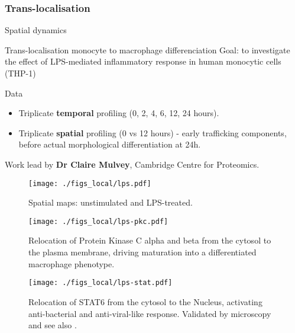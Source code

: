 \subsubsection{Trans-localisation}

\begin{frame}{Spatial dynamics}
  \begin{block}{Trans-localisation monocyte to macrophage
      differenciation}
    Goal: to investigate the effect of LPS-mediated inflammatory
    response in human monocytic cells (THP-1)    
  \end{block}

  \begin{block}{Data}
    \begin{itemize}
    \item Triplicate \textbf{temporal} profiling (0, 2, 4, 6, 12, 24
      hours).
    \item Triplicate \textbf{spatial} profiling (0 vs 12 hours) -
      early trafficking components, before actual morphological
      differentiation at 24h.
    \end{itemize}
  \end{block}

  Work lead by \textbf{Dr Claire Mulvey}, Cambridge Centre for
  Proteomics.
  
\end{frame}



\begin{frame}
  \begin{figure}[h]
    \centering
    \texttt{[image: ./figs\_local/lps.pdf]}
    \caption{Spatial maps: unstimulated and LPS-treated.}
  \end{figure}
\end{frame}

\begin{frame}
  \begin{figure}[h]
    \centering
    \texttt{[image: ./figs\_local/lps-pkc.pdf]}
    \caption{Relocation of Protein Kinase C alpha and beta from the
      cytosol to the plasma membrane, driving maturation into a
      differentiated macrophage phenotype.}
  \end{figure}
\end{frame}

\begin{frame}
  \begin{figure}[h]
    \centering
    \texttt{[image: ./figs\_local/lps-stat.pdf]}
    \caption{Relocation of STAT6 from the cytosol to the Nucleus,
      activating anti-bacterial and anti-viral-like
      response. Validated by microscopy and see also
      \cite{Chen:2011}.}
  \end{figure}
\end{frame}



